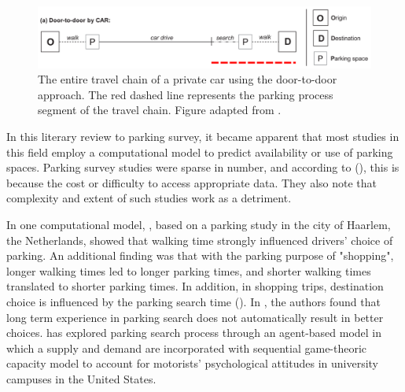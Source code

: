 \begin{figure}[H]%
    \includegraphics[width=\textwidth]{images/door2door.png}
    \caption[Door-to-door approach]{The entire travel chain of a private car using the door-to-door approach. The red dashed line represents the parking process segment of the travel chain. Figure adapted from .}%
    \label{fig:door-to-door}%
\end{figure}

In this literary review to parking survey, it became apparent that most studies in this field employ a computational model to predict availability or use of parking spaces. Parking survey studies were sparse in number, and according to \citeauthor{Diallo2015} (\citeyear{Diallo2015}), this is because the cost or difficulty to access appropriate data. They also note that complexity and extent of such studies work as a detriment.

In one computational model, , based on a parking study in the city of Haarlem, the Netherlands, showed that walking time strongly influenced drivers' choice of parking. An additional finding was that with the parking purpose of "shopping", longer walking times led to longer parking times, and shorter walking times translated to shorter parking times. In addition, in shopping trips, destination choice is influenced by the parking search time (\cite{Axhausen1993}). In \cite{Thompson1998}, the authors found that long term experience in parking search does not automatically result in better choices. \cite{Guo2013} has explored parking search process through an agent-based model in which a supply and demand are incorporated with sequential game-theoric capacity model to account for motorists' psychological attitudes in university campuses in the United States. 

